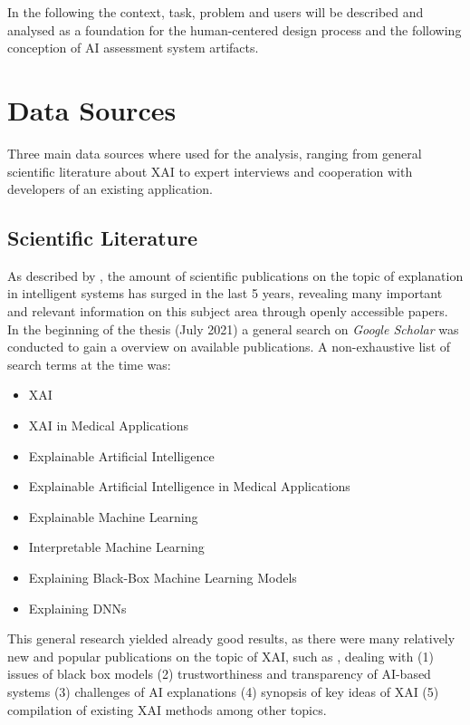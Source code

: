 \documentclass[11pt,a4paper,english]{scrreprt}
\begin{document}
In the following the context, task, problem and users will be described and analysed as a foundation for the human-centered design process and the following conception of AI assessment system artifacts.

\section{Data Sources}
Three main data sources where used for the analysis, ranging from general scientific literature about XAI to expert interviews and cooperation with developers of an existing application.

\subsection{Scientific Literature}\label{subsection:literature}
As described by \textcite{mueller_explanation_2019}, the amount of scientific publications on the topic of explanation in intelligent systems has surged in the last 5 years, revealing many important and relevant information on this subject area through openly accessible papers. In the beginning of the thesis (July 2021) a general search on \textit{Google Scholar} was conducted to gain a overview on available publications. A non-exhaustive list of search terms at the time was:
\begin{itemize}
    \item XAI
    \item XAI in Medical Applications
    \item Explainable Artificial Intelligence
    \item Explainable Artificial Intelligence in Medical Applications
    \item Explainable Machine Learning
    \item Interpretable Machine Learning
    \item Explaining Black-Box Machine Learning Models
    \item Explaining DNNs
\end{itemize}
This general research yielded already good results, as there were many relatively new and popular publications on the topic of XAI, such as \textcite{mueller_explanation_2019,ras_explainable_2021,ras_explanation_2018,adadi_blackbox_2018,hoffman_metrics_2019}, dealing with (1) issues of black box models (2) trustworthiness and transparency of AI-based systems (3) challenges of AI explanations (4) synopsis of key ideas of XAI (5) compilation of existing XAI methods among other topics.
\end{document}

